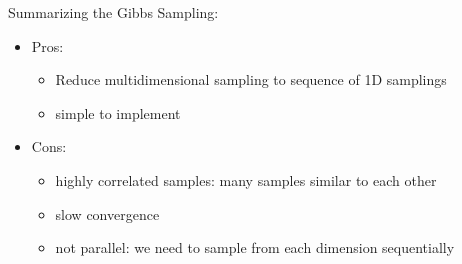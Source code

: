 \documentclass{article}
\begin{document}
Summarizing the Gibbs Sampling:
\begin{itemize}
    \item Pros: \begin{itemize}
        \item Reduce multidimensional sampling to sequence of 1D samplings
        \item simple to implement
    \end{itemize}
    \item Cons: \begin{itemize}
        \item highly correlated samples: many samples similar to each other
        \item slow convergence
        \item not parallel: we need to sample from each dimension sequentially
    \end{itemize}
\end{itemize}
\end{document}
